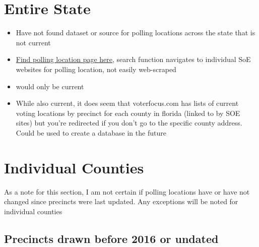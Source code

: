 \documentclass[12pt]{article}
\title{\tb{Polling Location Notes}}
\author{Annika}
\affil{New College of Florida}
\date{June 6, 2020}
\begin{document}
\maketitle
\clearpage

\tableofcontents
\clearpage

\section{Entire State}
\begin{itemize}
  \item Have not found dataset or source for polling locations across the state that is not current
  \item \href{https://registration.elections.myflorida.com/CheckVoterStatus}{Find polling location page here}, search function navigates to individual SoE websites for polling location, not easily web-scraped
  \item would only be current
  \item While also current, it does seem that voterfocus.com has lists of current voting locations by precinct for each county in florida (linked to by SOE sites) but you're redirected if you don't go to the specific county address. Could be used to create a database in the future
\end{itemize}

\clearpage

\section{Individual Counties}

As a note for this section, I am not certain if polling locations have or have not changed since precincts were last updated. Any exceptions will be noted for individual counties


\subsection{Precincts drawn before 2016 or undated}
\end{document}
